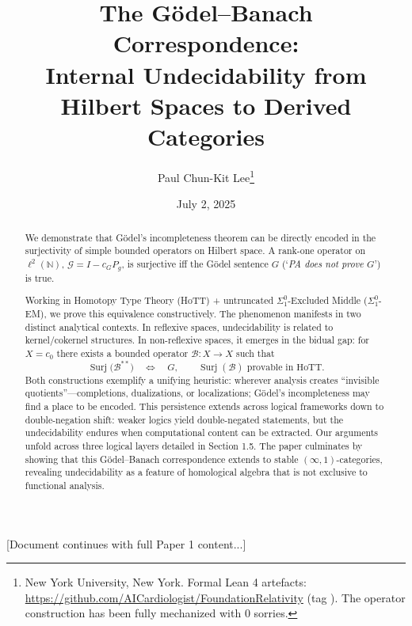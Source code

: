 \documentclass[11pt]{article}
\title{The Gödel--Banach Correspondence:\\
  Internal Undecidability from Hilbert Spaces to Derived Categories}
\author{Paul Chun-Kit Lee\thanks{New York University, New York.  Formal Lean 4 artefacts: \url{https://github.com/AICardiologist/FoundationRelativity}
(tag \leanRepoTag).  The operator construction has been fully mechanized with 0 sorries.  }}
\date{July 2, 2025}
\theoremstyle{definition}
\newcommand{\N}{\mathbb{N}}
\newcommand{\lp}{\ell^{2}(\N)}
\newcommand{\SigOne}{\Sigma^{0}_{\!1}}
\DeclareMathOperator{\Surj}{Surj}
\begin{document}
\maketitle

\begin{abstract}
\noindent
We demonstrate that Gödel's incompleteness theorem can be directly encoded in the surjectivity of simple bounded operators on Hilbert space. A rank-one operator on $\lp$, $\mathcal G = I - c_{G}P_{g}$, is surjective iff the Gödel sentence $G$ (`\emph{PA does not prove $G$}') is true.

Working in Homotopy Type Theory (HoTT) + untruncated $\SigOne$-Excluded Middle ($\SigOne$-EM), we prove this equivalence constructively. The phenomenon manifests in two distinct analytical contexts. In reflexive spaces, undecidability is related to kernel/cokernel structures. In non-reflexive spaces, it emerges in the bidual gap: for $X = c_{0}$ there exists a bounded operator $\mathcal B : X \to X$ such that
\[
  \Surj\bigl(\mathcal B^{**}\bigr) \quad\Longleftrightarrow\quad G,
  \qquad
  \Surj(\mathcal B) \text{ provable in HoTT.}
\]
Both constructions exemplify a unifying heuristic: wherever analysis creates ``invisible quotients''---completions, dualizations, or localizations; Gödel's incompleteness may find a place to be encoded. This persistence extends across logical frameworks down to double-negation shift: weaker logics yield double-negated statements, but the undecidability endures when computational content can be extracted. Our arguments unfold across three logical layers detailed in Section 1.5. The paper culminates by showing that this Gödel--Banach correspondence extends to stable $(\infty,1)$-categories, revealing undecidability as a feature of homological algebra that is not exclusive to functional analysis.
\end{abstract}

[Document continues with full Paper 1 content...]
\end{document}
